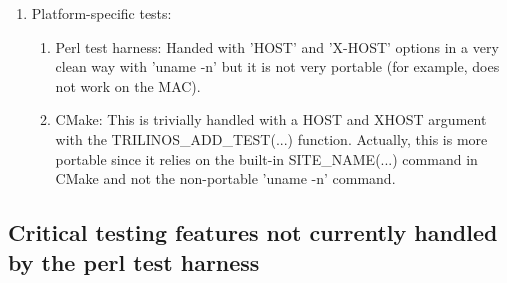 \documentclass[pdf,ps2pdf,11pt]{SANDreport}
\begin{document}
\begin{enumerate}
\begin{enumerate}
  \end{enumerate}

{}\item Platform-specific tests:

  \begin{enumerate}

  {}\item Perl test harness: Handed with 'HOST' and 'X-HOST' options
  in a very clean way with 'uname -n' but it is not very portable (for
  example, does not work on the MAC).

  {}\item CMake: This is trivially handled with a HOST and XHOST
  argument with the TRILINOS\_ADD\_TEST(...) function.  Actually, this
  is more portable since it relies on the built-in SITE\_NAME(...) 
  command in CMake and not the non-portable 'uname -n' command.

  \end{enumerate}

\end{enumerate}

%
{}\subsection{Critical testing features not currently handled by the perl
test harness}
%
\end{document}
